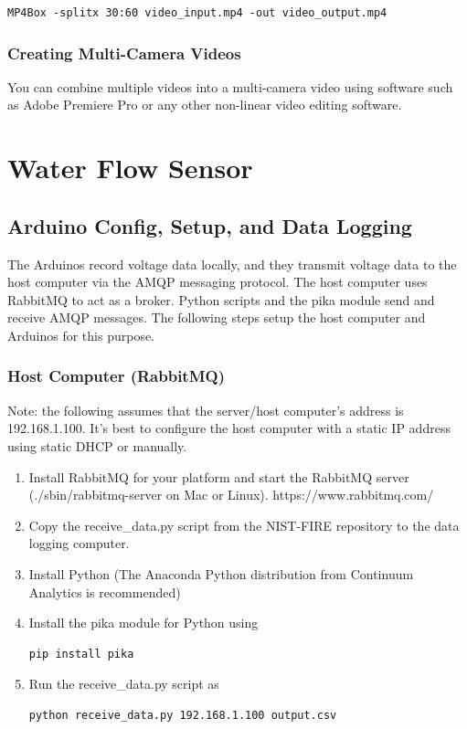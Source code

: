 \documentclass[11pt,oneside]{book}
\begin{document}
\begin{verbatim}
MP4Box -splitx 30:60 video_input.mp4 -out video_output.mp4
\end{verbatim}

\subsection{Creating Multi-Camera Videos}

You can combine multiple videos into a multi-camera video using software such as Adobe Premiere Pro or any other non-linear video editing software.


\chapter{Water Flow Sensor}
\label{chap:Water_Flow_Sensor}

\section{Arduino Config, Setup, and Data Logging}

The Arduinos record voltage data locally, and they transmit voltage data to the host computer via the AMQP messaging protocol. The host computer uses RabbitMQ to act as a broker. Python scripts and the pika module send and receive AMQP messages. The following steps setup the host computer and Arduinos for this purpose.

\subsection{Host Computer (RabbitMQ)}

Note: the following assumes that the server/host computer's address is 192.168.1.100. It's best to configure the host computer with a static IP address using static DHCP or manually.

\begin{enumerate}
\item Install RabbitMQ for your platform and start the RabbitMQ server (./sbin/rabbitmq-server on Mac or Linux).
https://www.rabbitmq.com/
\item Copy the receive\_data.py script from the NIST-FIRE repository to the data logging computer.
\item Install Python (The Anaconda Python distribution from Continuum Analytics is recommended)
\item Install the pika module for Python using
\begin{verbatim}
pip install pika
\end{verbatim}
\item Run the receive\_data.py script as
\begin{verbatim}
python receive_data.py 192.168.1.100 output.csv
\end{verbatim}
\end{enumerate}
\end{document}
